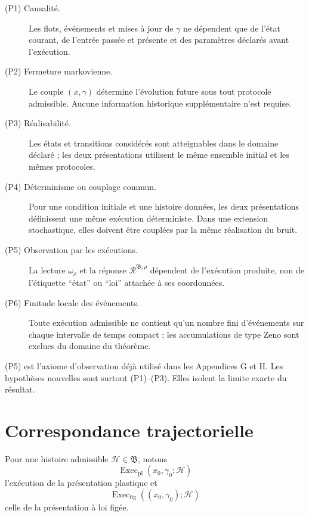 \begin{description}
\item[(P1) Causalité.] Les flots, événements et mises à jour de $\gamma$
ne dépendent que de l'état courant, de l'entrée passée et présente et
des paramètres déclarés avant l'exécution.

\item[(P2) Fermeture markovienne.] Le couple $(x,\gamma)$ détermine
l'évolution future sous tout protocole admissible. Aucune information
historique supplémentaire n'est requise.

\item[(P3) Réalisabilité.] Les états et transitions considérés sont
atteignables dans le domaine déclaré ; les deux présentations utilisent
le même ensemble initial et les mêmes protocoles.

\item[(P4) Déterminisme ou couplage commun.] Pour une condition initiale
et une histoire données, les deux présentations définissent une même
exécution déterministe. Dans une extension stochastique, elles doivent
être couplées par la même réalisation du bruit.

\item[(P5) Observation par les exécutions.] La lecture
$\omega_\rho$ et la réponse $\mathcal R^{\mathfrak B,\rho}$ dépendent de
l'exécution produite, non de l'étiquette ``état'' ou ``loi'' attachée à
ses coordonnées.

\item[(P6) Finitude locale des événements.] Toute exécution admissible ne
contient qu'un nombre fini d'événements sur chaque intervalle de temps
compact ; les accumulations de type Zeno sont exclues du domaine du
théorème.
\end{description}

(P5) est l'axiome d'observation déjà utilisé dans les Appendices G et H.
Les hypothèses nouvelles sont surtout (P1)--(P3). Elles isolent la limite
exacte du résultat.

\section{Correspondance trajectorielle}
\label{annexe-K-correspondance}

Pour une histoire admissible $\mathcal H\in\mathfrak B$, notons
\[
\operatorname{Exec}_{\mathrm{pl}}(x_0,\gamma_0;\mathcal H)
\]
l'exécution de la présentation plastique et
\[
\operatorname{Exec}_{\mathrm{fig}}((x_0,\gamma_0);\mathcal H)
\]
celle de la présentation à loi figée.

